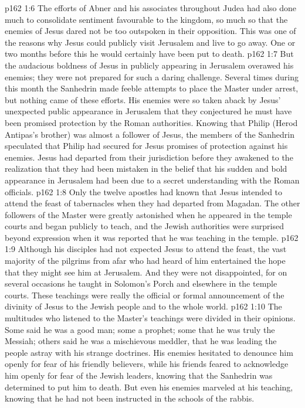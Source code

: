 \vs p162 1:6 The efforts of Abner and his associates throughout Judea had also done much to consolidate sentiment favourable to the kingdom, so much so that the enemies of Jesus dared not be too outspoken in their opposition. This was one of the reasons why Jesus could publicly visit Jerusalem and live to go away. One or two months before this he would certainly have been put to death.
\vs p162 1:7 But the audacious boldness of Jesus in publicly appearing in Jerusalem overawed his enemies; they were not prepared for such a daring challenge. Several times during this month the Sanhedrin made feeble attempts to place the Master under arrest, but nothing came of these efforts. His enemies were so taken aback by Jesus’ unexpected public appearance in Jerusalem that they conjectured he must have been promised protection by the Roman authorities. Knowing that Philip (Herod Antipas’s brother) was almost a follower of Jesus, the members of the Sanhedrin speculated that Philip had secured for Jesus promises of protection against his enemies. Jesus had departed from their jurisdiction before they awakened to the realization that they had been mistaken in the belief that his sudden and bold appearance in Jerusalem had been due to a secret understanding with the Roman officials.
\vs p162 1:8 Only the twelve apostles had known that Jesus intended to attend the feast of tabernacles when they had departed from Magadan. The other followers of the Master were greatly astonished when he appeared in the temple courts and began publicly to teach, and the Jewish authorities were surprised beyond expression when it was reported that he was teaching in the temple.
\vs p162 1:9 Although his disciples had not expected Jesus to attend the feast, the vast majority of the pilgrims from afar who had heard of him entertained the hope that they might see him at Jerusalem. And they were not disappointed, for on several occasions he taught in Solomon’s Porch and elsewhere in the temple courts. These teachings were really the official or formal announcement of the divinity of Jesus to the Jewish people and to the whole world.
\vs p162 1:10 The multitudes who listened to the Master’s teachings were divided in their opinions. Some said he was a good man; some a prophet; some that he was truly the Messiah; others said he was a mischievous meddler, that he was leading the people astray with his strange doctrines. His enemies hesitated to denounce him openly for fear of his friendly believers, while his friends feared to acknowledge him openly for fear of the Jewish leaders, knowing that the Sanhedrin was determined to put him to death. But even his enemies marveled at his teaching, knowing that he had not been instructed in the schools of the rabbis.
